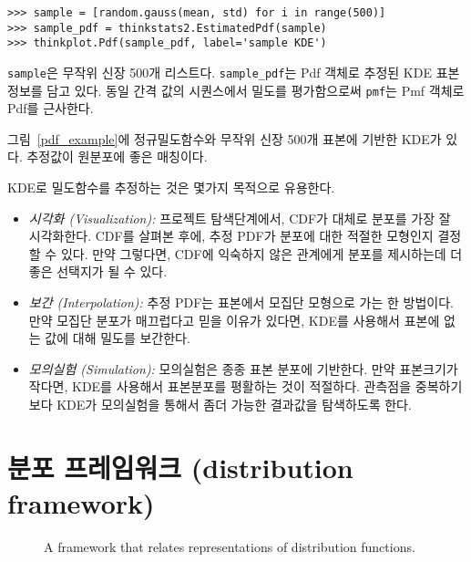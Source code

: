 \begin{verbatim}
>>> sample = [random.gauss(mean, std) for i in range(500)]
>>> sample_pdf = thinkstats2.EstimatedPdf(sample)
>>> thinkplot.Pdf(sample_pdf, label='sample KDE')
\end{verbatim}

\verb"sample"은 무작위 신장 500개 리스트다. 
\verb"sample_pdf"는 Pdf 객체로 추정된 KDE 표본정보를 담고 있다.
동일 간격 값의 시퀀스에서 밀도를 평가함으로써 {\tt pmf}는 Pmf 객체로 Pdf를 근사한다.

그림~\ref{pdf_example}에 정규밀도함수와 무작위 신장 500개 표본에 기반한 KDE가 있다. 추정값이 원분포에 좋은 매칭이다.

KDE로 밀도함수를 추정하는 것은 몇가지 목적으로 유용한다. 


\begin{itemize}

\item {\it 시각화 (Visualization):} 
  프로젝트 탐색단계에서, CDF가 대체로 분포를 가장 잘 시각화한다.
  CDF를 살펴본 후에, 추정 PDF가 분포에 대한 적절한 모형인지 결정할 수 있다.
  만약 그렇다면, CDF에 익숙하지 않은 관계에게 분포를 제시하는데 더 좋은 선택지가 될 수 있다.

\item {\it 보간 (Interpolation):} 
  추정 PDF는 표본에서 모집단 모형으로 가는 한 방법이다.
  만약 모집단 분포가 매끄럽다고 믿을 이유가 있다면, KDE를 사용해서 표본에 없는 값에 대해 밀도를 보간한다.

\item {\it 모의실험 (Simulation):} 
  모의실험은 종종 표본 분포에 기반한다. 
  만약 표본크기가 작다면, KDE를 사용해서 표본분포를 평활하는 것이 적절하다.
  관측점을 중복하기 보다 KDE가 모의실험을 통해서 좀더 가능한 결과값을 탐색하도록 한다.

\end{itemize}


\section{분포 프레임워크 (distribution framework)}

\begin{figure}
\caption{A framework that relates representations of distribution
functions.}
\label{dist_framework}
\end{figure}

